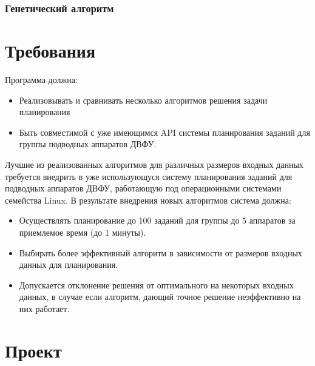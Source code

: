\documentclass[a4paper,14pt,russian]{article}
\begin{document}
\subsubsection{Генетический алгоритм}


\section{Требования}



Программа должна:
\begin{itemize}
\item Реализовывать и сравнивать несколько алгоритмов решения задачи планирования
\item Быть совместимой с уже имеющимся API системы планирования заданий для группы подводных аппаратов ДВФУ.
\end{itemize}

Лучшие из реализованных алгоритмов для различных размеров входных данных требуется внедрить в уже использующуся систему планирования заданий для подводных аппаратов ДВФУ, работающую под операционными системами семейства Linux. В результате внедрения новых алгоритмов система должна:
\begin{itemize}

\item Осуществлять планирование до 100 заданий для группы до 5 аппаратов за приемлемое время (до 1 минуты).
\item Выбирать более эффективный алгоритм в зависимости от размеров входных данных для планирования.
\item Допускается отклонение решения от оптимального на некоторых входных данных, в случае если алгоритм, дающий точное решение неэффективно на них работает.
\end{itemize}


\section{Проект}
\end{document}
